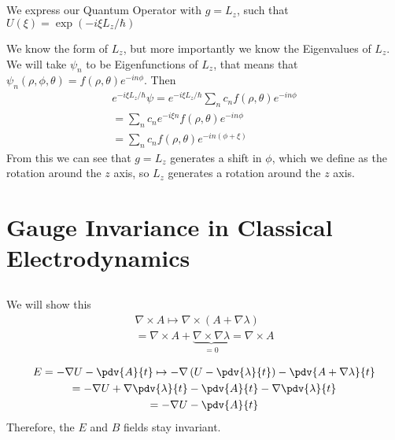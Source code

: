 \documentclass[]{scrartcl}
\begin{document}
\subsection{}
We express our Quantum Operator with $g = L_z$, such that $U(\xi) = \exp(-i\xi L_z/\hbar)$

We know the form of $L_z$, but more importantly we know the Eigenvalues of $L_z$. We will take $\psi_n$ to be Eigenfunctions of $L_z$, that means that $\psi_n(\rho,\phi,\theta) = f(\rho,\theta)e^{-in\phi}$. Then
\begin{gather*}
	e^{-i\xi L_z/\hbar} \psi = e^{-i\xi L_z/\hbar}\sum_n c_n f(\rho,\theta)e^{-in\phi}\\
	= \sum_n c_n e^{-i\xi n}f(\rho,\theta)e^{-in\phi}\\
	= \sum_n c_n f(\rho,\theta)e^{-in(\phi + \xi)}
\end{gather*}
From this we can see that $g = L_z$ generates a shift in $\phi$, which we define as the rotation around the $z$ axis, so $L_z$ generates a rotation around the $z$ axis.

\subsection{}

\section{Gauge Invariance in Classical Electrodynamics}

\subsection{}
We will show this
\begin{gather*}
	\nabla \times A \mapsto \nabla \times (A + \nabla \lambda)\\
= \nabla \times A + \underbrace{\nabla\times\nabla\lambda}_{=0} = \nabla\times A
\end{gather*}

\begin{gather*}
	E = -\nabla U - \pdv{A}{t} \mapsto -\nabla\left(U - \pdv{\lambda}{t}\right) - \pdv{A + \nabla\lambda}{t}\\
	= -\nabla U + \nabla\pdv{\lambda}{t} - \pdv{A}{t} - \nabla\pdv{\lambda}{t}\\
	= -\nabla U - \pdv{A}{t}
\end{gather*}
Therefore, the $E$ and $B$ fields stay invariant.

\subsection{}
\end{document}
